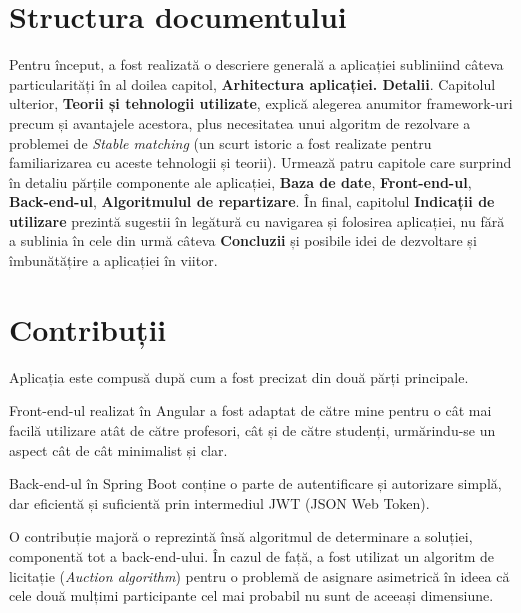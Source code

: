 \section{Structura documentului}

Pentru început, a fost realizată o descriere generală a aplicației subliniind câteva particularități în al doilea capitol, \textbf{Arhitectura aplicației. Detalii}.
Capitolul ulterior, \textbf{Teorii și tehnologii utilizate}, explică alegerea anumitor framework-uri precum și avantajele acestora, plus necesitatea unui algoritm de rezolvare a problemei de \textit{Stable matching} (un scurt istoric a fost realizate pentru familiarizarea cu aceste tehnologii și teorii).
Urmează patru capitole care surprind în detaliu părțile componente ale aplicației, \textbf{Baza de date}, \textbf{Front-end-ul}, \textbf{Back-end-ul}, \textbf{Algoritmulul de repartizare}.
În final, capitolul \textbf{Indicații de utilizare} prezintă sugestii în legătură cu navigarea și folosirea aplicației, nu fără a sublinia în cele din urmă câteva \textbf{Concluzii} și posibile idei de dezvoltare și îmbunătățire a aplicației în viitor.

\section{Contribuții}
Aplicația \textbf{\thesistitle} este compusă după cum a fost precizat din două părți principale.

Front-end-ul realizat în Angular a fost adaptat de către mine pentru o cât mai facilă utilizare atât de către profesori, cât și de către studenți, urmărindu-se un aspect cât de cât minimalist și clar.

Back-end-ul în Spring Boot conține o parte de autentificare și autorizare simplă, dar eficientă și suficientă prin intermediul JWT (JSON Web Token).

O contribuție majoră o reprezintă însă algoritmul de determinare a soluției, componentă tot a back-end-ului. În cazul de față, a fost utilizat un algoritm de licitație (\textit{Auction algorithm}) pentru o problemă de asignare asimetrică în ideea că cele două mulțimi participante cel mai probabil nu sunt de aceeași dimensiune.